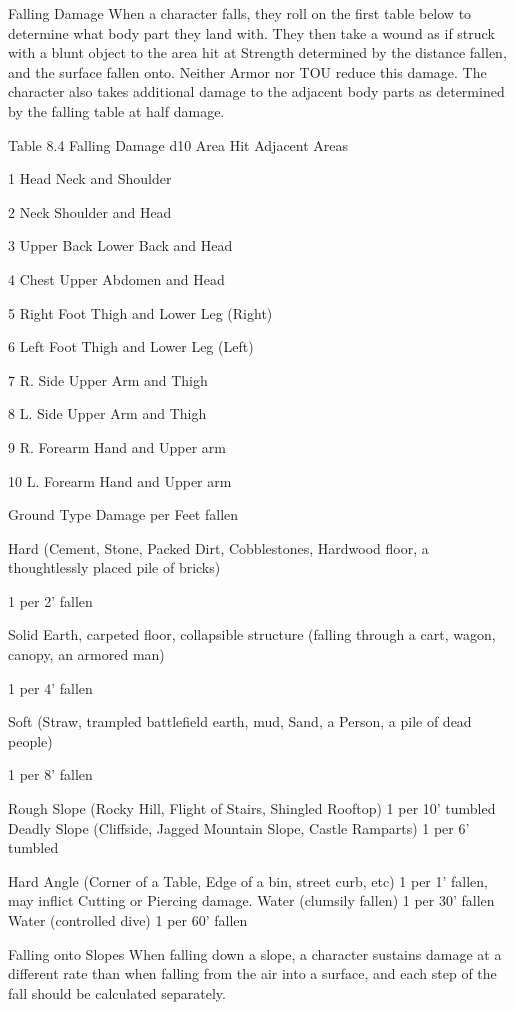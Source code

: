 \documentclass[oneside,11pt,english]{book}
\begin{document}
 

Falling Damage 
When a character falls, they roll on the first table below to determine what body part they land with. They 
then take a wound as if struck with a blunt object to the area hit at Strength determined by the distance 
fallen, and the surface fallen onto. Neither Armor nor TOU reduce this damage. The character also takes 
additional damage to the adjacent body parts as determined by the falling table at half damage. 

 

Table 8.4 Falling Damage 
d10 Area Hit Adjacent Areas 

1 Head Neck and Shoulder 

2 Neck Shoulder and Head 

3 Upper Back Lower Back and Head 

4 Chest Upper Abdomen and Head 

5 Right Foot Thigh and Lower Leg (Right) 

6 Left Foot Thigh and Lower Leg (Left) 

7 R. Side Upper Arm and Thigh 

8 L. Side Upper Arm and Thigh 

9 R. Forearm Hand and Upper arm 

10 L. Forearm Hand and Upper arm 

 

Ground Type Damage per Feet fallen 

Hard (Cement, Stone, Packed Dirt, Cobblestones, Hardwood floor, 
a thoughtlessly placed pile of bricks) 

1 per 2’ fallen 

Solid Earth, carpeted floor, collapsible structure (falling through a 
cart, wagon, canopy, an armored man) 

1 per 4’ fallen 

Soft (Straw, trampled battlefield earth, mud, Sand, a Person, a pile 
of dead people) 

1 per 8’ fallen 

Rough Slope (Rocky Hill, Flight of Stairs, Shingled Rooftop) 1 per 10’ tumbled 
Deadly Slope (Cliffside, Jagged Mountain Slope, Castle Ramparts) 1 per 6’ tumbled 


Hard Angle (Corner of a Table, Edge of a bin, street curb, etc) 1 per 1’ fallen, may inflict Cutting 
or Piercing damage. 
Water (clumsily fallen) 1 per 30’ fallen 
Water (controlled dive) 1 per 60’ fallen 

 
Falling onto Slopes 
When falling down a slope, a character sustains damage at a different rate than when falling from the air 
into a surface, and each step of the fall should be calculated separately. 
\end{document}
